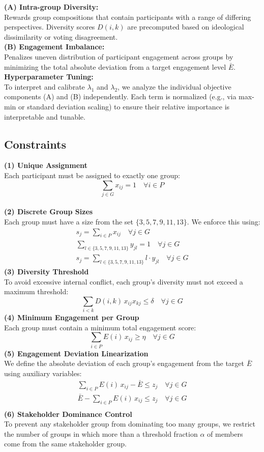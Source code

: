 \noindent
\textbf{(A) Intra-group Diversity:}\\[3pt]
Rewards group compositions that contain participants with a range of differing perspectives.
Diversity scores \(D(i,k)\) are precomputed based on ideological dissimilarity or voting disagreement.
\\
\textbf{(B) Engagement Imbalance:}\\[3pt]
Penalizes uneven distribution of participant engagement across groups by minimizing the total absolute deviation
from a target engagement level \(\bar{E}\).
\\
\textbf{Hyperparameter Tuning:}\\[3pt]
To interpret and calibrate \(\lambda_1\) and \(\lambda_2\), we analyze the individual objective components (A)
and (B) independently.
Each term is normalized (e.g., via max-min or standard deviation scaling)
to ensure their relative importance is interpretable and tunable.

\subsection*{Constraints}
\textbf{(1) Unique Assignment}\\[3pt]
Each participant must be assigned to exactly one group:
\[
\sum_{j \in G} x_{ij} = 1 \quad \forall i \in P
\]
\\
\textbf{(2) Discrete Group Sizes}\\[3pt]
Each group must have a size from the set \(\{3,5,7,9,11,13\}\).
We enforce this using:
\begin{gather*}
    s_j = \sum_{i \in P} x_{ij} \quad \forall j \in G\\
    \sum_{l \in \{3,5,7,9,11,13\}} y_{jl} = 1 \quad \forall j \in G\\
    s_j = \sum_{l \in \{3,5,7,9,11,13\}} l \cdot y_{jl} \quad \forall j \in G
\end{gather*}
\textbf{(3) Diversity Threshold}\\[3pt]
To avoid excessive internal conflict, each group’s diversity must not exceed a maximum threshold:
\[
\sum_{i < k} D(i,k)\,x_{ij} x_{kj} \leq \delta \quad \forall j \in G
\]
\textbf{(4) Minimum Engagement per Group}\\[3pt]
Each group must contain a minimum total engagement score:
\[
\sum_{i \in P} E(i)\,x_{ij} \geq \eta \quad \forall j \in G
\]
\textbf{(5) Engagement Deviation Linearization}\\[3pt]
We define the absolute deviation of each group’s engagement from the target \(\bar{E}\) using auxiliary variables:
\begin{gather*}
    \sum_{i \in P} E(i)\,x_{ij} - \bar{E} \leq z_j \quad \forall j \in G\\
    \bar{E} - \sum_{i \in P} E(i)\,x_{ij} \leq z_j \quad \forall j \in G\\
\end{gather*}
\textbf{(6) Stakeholder Dominance Control}\\[3pt]
To prevent any stakeholder group from dominating too many groups, we restrict the number of groups
in which more than a threshold fraction \(\alpha\) of members come from the same stakeholder group.


